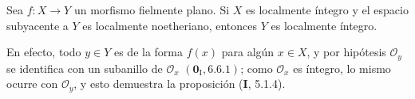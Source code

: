 \begin{proposition}[2.1.14]
\label{IV.2.1.14-fr}
Sea $f:X\to Y$ un morfismo fielmente plano. Si $X$ es localmente íntegro y el
espacio subyacente a $Y$ es localmente noetheriano, entonces $Y$ es localmente
íntegro.
\end{proposition}

En efecto, todo $y\in Y$ es de la forma $f(x)$ para algún $x\in X$, y por
hipótesis $\mathcal O_y$ se identifica con un subanillo de $\mathcal O_x$
$(\mathbf{0}_{\mathrm I},6.6.1)$; como $\mathcal O_x$ es íntegro, lo mismo ocurre con
$\mathcal O_y$, y esto demuestra la proposición (\textbf I, 5.1.4).
